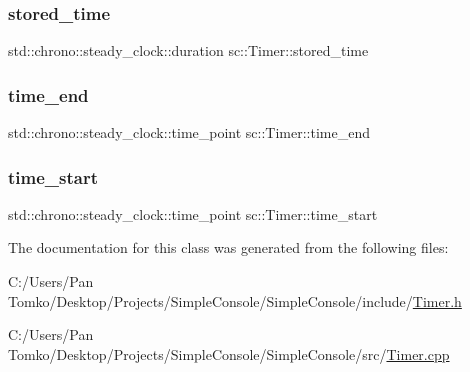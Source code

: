 \mbox{\label{classsc_1_1_timer_a78d41ad3dda6d9d5dea782407fc85648}} 
\subsubsection{\texorpdfstring{stored\_time}{stored\_time}}
{\footnotesize\ttfamily std\+::chrono\+::steady\+\_\+clock\+::duration sc\+::\+Timer\+::stored\+\_\+time\hspace{0.3cm}{\ttfamily [private]}}

\mbox{\label{classsc_1_1_timer_afeb4a40cc0ed2afbe4a0e2e0bf2f67cb}} 
\subsubsection{\texorpdfstring{time\_end}{time\_end}}
{\footnotesize\ttfamily std\+::chrono\+::steady\+\_\+clock\+::time\+\_\+point sc\+::\+Timer\+::time\+\_\+end\hspace{0.3cm}{\ttfamily [private]}}

\mbox{\label{classsc_1_1_timer_aa363104760a70b9e4535c9aeda427fb8}} 
\subsubsection{\texorpdfstring{time\_start}{time\_start}}
{\footnotesize\ttfamily std\+::chrono\+::steady\+\_\+clock\+::time\+\_\+point sc\+::\+Timer\+::time\+\_\+start\hspace{0.3cm}{\ttfamily [private]}}



The documentation for this class was generated from the following files\+:\begin{DoxyCompactItemize}
\item 
C\+:/\+Users/\+Pan Tomko/\+Desktop/\+Projects/\+Simple\+Console/\+Simple\+Console/include/\mbox{\hyperlink{_timer_8h}{Timer.\+h}}\item 
C\+:/\+Users/\+Pan Tomko/\+Desktop/\+Projects/\+Simple\+Console/\+Simple\+Console/src/\mbox{\hyperlink{_timer_8cpp}{Timer.\+cpp}}\end{DoxyCompactItemize}
